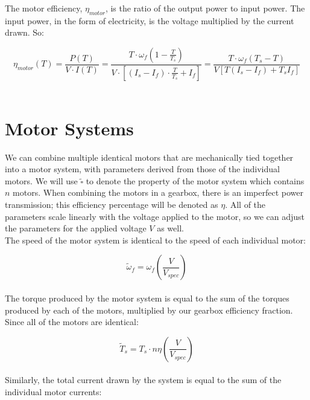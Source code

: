 \documentclass[a4paper]{article}
\begin{document}
	The motor efficiency, $ \eta_{motor} $, is the ratio of the output power to input power. The input power, in the form of electricity, is the voltage multiplied by the current drawn. So:
	
	\begin{equation}
		\eta_{motor} (T) = \frac{P(T)}{V \cdot I (T)}
		= \frac{T \cdot \omega_f \left( 1 - \frac{T}{T_s} \right)}{V \cdot \left[ \left( I_s - I_f \right) \cdot \frac{T}{T_s} + I_f \right]}
		= \frac{T \cdot \omega_f \left( T_s - T \right)}{V \left[ T \left( I_s - I_f \right) + T_s I_f \right]}
	\end{equation}\\
	
	
	\section{Motor Systems}
	
	We can combine multiple identical motors that are mechanically tied together into a motor system, with parameters derived from those of the individual motors. We will use $ \widetilde{\square} $ to denote the property of the motor system which contains $ n $ motors. When combining the motors in a gearbox, there is an imperfect power transmission; this efficiency percentage will be denoted as $ \eta $. All of the parameters scale linearly with the voltage applied to the motor, so we can adjust the parameters for the applied voltage $ V $ as well. \\
	
	The speed of the motor system is identical to the speed of each individual motor:
	
	\begin{equation}
		\widetilde{\omega}_f = \omega_f \left( \frac{V}{V_{spec}} \right)
	\end{equation}\\
	
	\newpage
	The torque produced by the motor system is equal to the sum of the torques produced by each of the motors, multiplied by our gearbox efficiency fraction. Since all of the motors are identical:
	
	\begin{equation}
		\widetilde{T}_s = T_s \cdot n \eta \left( \frac{V}{V_{spec}} \right)
	\end{equation}\\
	
	Similarly, the total current drawn by the system is equal to the sum of the individual motor currents:
	
\end{document}
